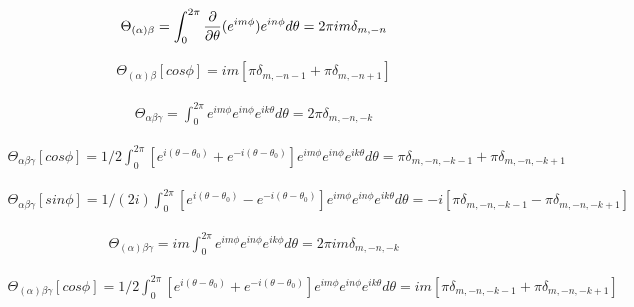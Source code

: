 \documentclass{Note}
\begin{document}
\begin{equation}
\begin{aligned}
\Theta_{(\alpha)\beta}=\int_0^{2\pi} {\partial \over \partial \theta}(e^{im\phi}) e^{in\phi} d\theta
=2\pi im \delta_{m,-n}
\end{aligned}
\end{equation}


\begin{equation}
\begin{aligned}
\Theta_{(\alpha)\beta}[cos\phi]=im[ \pi \delta_{m,-n-1}+\pi \delta_{m,-n+1}]
\end{aligned}
\end{equation}

\begin{equation}
\begin{aligned}
\Theta_{\alpha\beta\gamma}=\int_0^{2\pi} e^{im\phi} e^{in\phi}  e^{ik\theta} d\theta
=2\pi \delta_{m,-n,-k}
\end{aligned}
\end{equation}

\begin{equation}
\begin{aligned}
\Theta_{\alpha\beta\gamma}[cos\phi]=1/2 \int_0^{2\pi} [e^{i(\theta-\theta_0)}+e^{-i(\theta-\theta_0)}]  e^{im\phi} e^{in\phi}  e^{ik\theta} d\theta
=\pi \delta_{m,-n,-k-1}+\pi \delta_{m,-n,-k+1}
\end{aligned}
\end{equation}


\begin{equation}
\begin{aligned}
\Theta_{\alpha\beta\gamma}[sin\phi]=1/(2i) \int_0^{2\pi} [e^{i(\theta-\theta_0)}-e^{-i(\theta-\theta_0)}]  e^{im\phi} e^{in\phi}  e^{ik\theta} d\theta
=-i[\pi \delta_{m,-n,-k-1}-\pi \delta_{m,-n,-k+1}]
\end{aligned}
\end{equation}

\begin{equation}
\begin{aligned}
\Theta_{(\alpha)\beta\gamma}=im \int_0^{2\pi} e^{im\phi} e^{in\phi}  e^{ik\phi} d\theta
=2\pi im\delta_{m,-n,-k}
\end{aligned}
\end{equation}

\begin{equation}
\begin{aligned}
\Theta_{(\alpha)\beta\gamma}[cos\phi]=1/2 \int_0^{2\pi} [e^{i(\theta-\theta_0)}+e^{-i(\theta-\theta_0)}]  e^{im\phi} e^{in\phi}  e^{ik\theta} d\theta
=im[\pi \delta_{m,-n,-k-1}+\pi \delta_{m,-n,-k+1}]
\end{aligned}
\end{equation}
\end{document}
